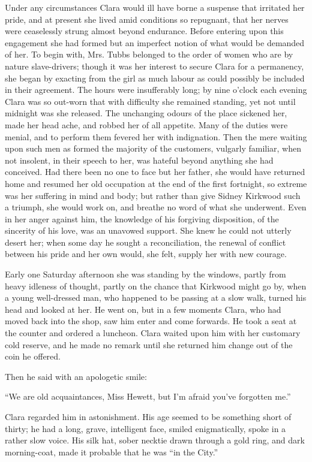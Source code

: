 Under any circumstances Clara would ill have borne a suspense that
irritated her pride, and at present she lived amid conditions so
repugnant, that her nerves were ceaselessly strung almost beyond
endurance. Before {}entering upon this engagement she had formed but an
imperfect notion of what would be demanded of her. To begin with, Mrs.
Tubbs belonged to the order of women who are by nature slave-drivers;
though it was her interest to secure Clara for a permanency, she began
by exacting from the girl as much labour as could possibly be included
in their agreement. The hours were insufferably long; by nine o'clock
each evening Clara was so out-worn that with difficulty she remained
standing, yet not until midnight was she released. The unchanging odours
of the place sickened her, made her head ache, and robbed her of all
appetite. Many of the duties were menial, and to perform them fevered
her with indignation. Then the mere waiting upon such men as formed the
majority of the customers, vulgarly familiar, when not insolent, in
their speech to her, was hateful beyond anything she had conceived. Had
there been no one to face but her father, she would have returned home
and resumed her old occupation at the end of the first fortnight, so
extreme {}was her suffering in mind and body; but rather than give
Sidney Kirkwood such a triumph, she would work on, and breathe no word
of what she underwent. Even in her anger against him, the knowledge of
his forgiving disposition, of the sincerity of his love, was an unavowed
support. She knew he could not utterly desert her; when some day he
sought a reconciliation, the renewal of conflict between his pride and
her own would, she felt, supply her with new courage.

Early one Saturday afternoon she was standing by the windows, partly
from heavy idleness of thought, partly on the chance that Kirkwood might
go by, when a young well-dressed man, who happened to be passing at a
slow walk, turned his head and looked at her. He went on, but in a few
moments Clara, who had moved back into the shop, saw him enter and come
forwards. He took a seat at the counter and ordered a luncheon. Clara
waited upon him with her customary cold reserve, and he made no remark
until she returned him change out of the coin he offered.

{}Then he said with an apologetic smile:

``We are old acquaintances, Miss Hewett, but I'm afraid you've forgotten
me.''

Clara regarded him in astonishment. His age seemed to be something short
of thirty; he had a long, grave, intelligent face, smiled enigmatically,
spoke in a rather slow voice. His silk hat, sober necktie drawn through
a gold ring, and dark morning-coat, made it probable that he was ``in
the City.''

